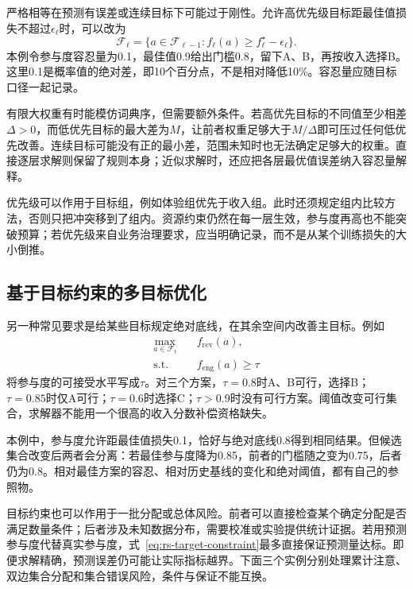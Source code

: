 严格相等在预测有误差或连续目标下可能过于刚性。允许高优先级目标距最佳值损失不超过$\epsilon_\ell$时，可以改为
\[
 \mathcal{F}_\ell=
 \{a\in\mathcal{F}_{\ell-1}:
       f_\ell(a)\geq f_\ell^\star-\epsilon_\ell\}.
\]
本例令参与度容忍量为0.1，最佳值0.9给出门槛0.8，留下A、B，再按收入选择B。这里0.1是概率值的绝对差，即10个百分点，不是相对降低10\%。容忍量应随目标口径一起记录。

有限大权重有时能模仿词典序，但需要额外条件。若高优先目标的不同值至少相差$\Delta>0$，而低优先目标的最大差为$M$，让前者权重足够大于$M/\Delta$即可压过任何低优先改善。连续目标可能没有正的最小差，范围未知时也无法确定足够大的权重。直接逐层求解则保留了规则本身；近似求解时，还应把各层最优值误差纳入容忍量解释。

优先级可以作用于目标组，例如体验组优先于收入组。此时还须规定组内比较方法，否则只把冲突移到了组内。资源约束仍然在每一层生效，参与度再高也不能突破预算；若优先级来自业务治理要求，应当明确记录，而不是从某个训练损失的大小倒推。

\subsection{基于目标约束的多目标优化}
\label{sec:rs-goal-constrained-objectives}

另一种常见要求是给某些目标规定绝对底线，在其余空间内改善主目标。例如
\begin{equation}
 \begin{aligned}
  \max_{a\in\mathcal{F}_t}\quad&f_{\mathrm{rev}}(a),\\
  \text{s.t.}\quad&f_{\mathrm{eng}}(a)\geq\tau
 \end{aligned}
 \label{eq:rs-target-constraint}
\end{equation}
将参与度的可接受水平写成$\tau$。对三个方案，$\tau=0.8$时A、B可行，选择B；$\tau=0.85$时仅A可行；$\tau=0.6$时选择C；$\tau>0.9$时没有可行方案。阈值改变可行集合，求解器不能用一个很高的收入分数补偿资格缺失。

本例中，参与度允许距最佳值损失0.1，恰好与绝对底线0.8得到相同结果。但候选集合改变后两者会分离：若最佳参与度降为0.85，前者的门槛随之变为0.75，后者仍为0.8。相对最佳方案的容忍、相对历史基线的变化和绝对阈值，都有自己的参照物。

目标约束也可以作用于一批分配或总体风险。前者可以直接检查某个确定分配是否满足数量条件；后者涉及未知数据分布，需要校准或实验提供统计证据。若用预测参与度代替真实参与度，式~\eqref{eq:rs-target-constraint}最多直接保证预测量达标。即便求解精确，预测误差仍可能让实际指标越界。下面三个实例分别处理累计注意、双边集合分配和集合错误风险，条件与保证不能互换。

